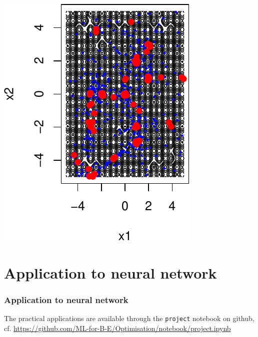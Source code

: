\documentclass[12pt]{beamer}
\begin{document}
\begin{frame}
\begin{center}
{\begin{minipage}[t]{0.4\textwidth}
\includegraphics[width=\textwidth]{rastrigin_budget1000_restart10_x-crop.pdf}
\end{minipage}
}
\end{center}
\end{frame}


\section{Application to neural network}

\begin{frame}%
\frametitle{Application to neural network} 
\begin{center}
The practical applications are available through the \texttt{project} notebook on github,
cf. \url{https://github.com/ML-for-B-E/Optimisation/notebook/project.ipynb}
\end{center}
\end{frame}
\end{document}
